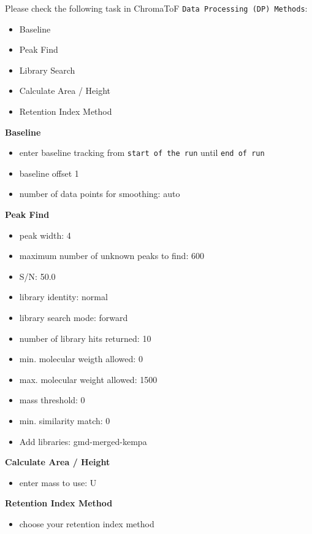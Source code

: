 \documentclass[]{book}
\providecommand{\tightlist}{%
  \setlength{\itemsep}{0pt}\setlength{\parskip}{0pt}}
\theoremstyle{definition}
\theoremstyle{definition}
\theoremstyle{definition}
\theoremstyle{remark}
\begin{document}
Please check the following task in ChromaToF
\texttt{Data\ Processing\ (DP)\ Methods}:

\begin{itemize}
\tightlist
\item
  Baseline
\item
  Peak Find
\item
  Library Search
\item
  Calculate Area / Height
\item
  Retention Index Method
\end{itemize}

\textbf{Baseline}

\begin{itemize}
\tightlist
\item
  enter baseline tracking from \texttt{start\ of\ the\ run} until
  \texttt{end\ of\ run}
\item
  baseline offset 1
\item
  number of data points for smoothing: auto
\end{itemize}

\textbf{Peak Find}

\begin{itemize}
\tightlist
\item
  peak width: 4
\item
  maximum number of unknown peaks to find: 600
\item
  S/N: 50.0
\item
  library identity: normal
\item
  library search mode: forward
\item
  number of library hits returned: 10
\item
  min. molecular weigth allowed: 0
\item
  max. molecular weight allowed: 1500
\item
  mass threshold: 0
\item
  min. similarity match: 0
\item
  Add libraries: gmd-merged-kempa
\end{itemize}

\textbf{Calculate Area / Height}

\begin{itemize}
\tightlist
\item
  enter mass to use: U
\end{itemize}

\textbf{Retention Index Method}

\begin{itemize}
\tightlist
\item
  choose your retention index method
\end{itemize}
\end{document}
